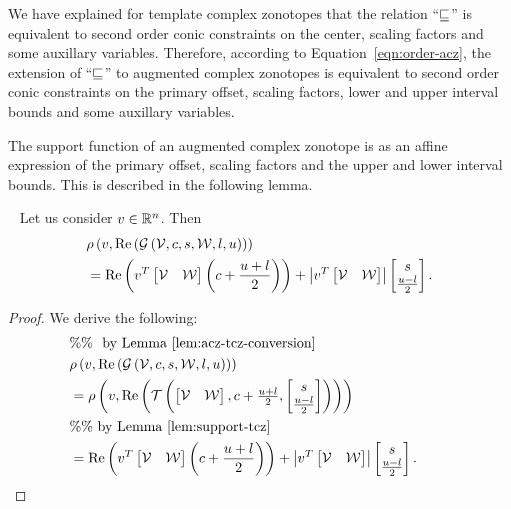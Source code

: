 %
\begin{remark}
We have explained for template complex zonotopes that the relation
``$\sqsubseteq$'' is equivalent to second order conic constraints on the
center, scaling factors and some auxillary variables.  Therefore,
according to Equation~\ref{eqn:order-acz}, the extension of ``$\sqsubseteq$''
to augmented complex zonotopes is equivalent to second order conic
constraints on the primary offset, scaling factors, lower and upper
interval bounds and some auxillary variables.
\end{remark}
%
The support function of an augmented complex zonotope is as an affine
expression of the primary offset, scaling factors and the upper and
lower interval bounds.  This is described in the following lemma.
%
\begin{lemma}~\label{lem:support-acz}
Let us consider
$v\in\mathbb{R}^n$.  Then
%
\begin{align*}
  & \rho\left(v,\operatorname{Re}\left(\mathcal{G}\left(\mathcal{V},c,s,\mathcal{W},l,u\right)\right)\right)\\
  & = \operatorname{Re}\left(v^T\left[\begin{matrix}\mathcal{V} &
    \mathcal{W}\end{matrix}\right]\left(c+\frac{u+l}{2}\right)\right)+\left|v^T\left[\begin{matrix}\mathcal{V} & \mathcal{W}\end{matrix}\right]\right|\left[\begin{matrix}s\\\frac{u-l}{2}\end{matrix}\right].
\end{align*}
%
\end{lemma}
%
\begin{proof}
  We derive the following:
  \begin{align*}
& \%\%~~\text{by Lemma~\ref{lem:acz-tcz-conversion}}\\
&
    \rho\left(v,\operatorname{Re}\left(\mathcal{G}\left(\mathcal{V},c,s,\mathcal{W},l,u\right)\right)\right)\\
& = \rho\left(v,\operatorname{Re}\left(\mathit{\operatorname{\mathcal{T}}}\left(\left[\begin{matrix}
      \mathcal{V} &
      \mathcal{W}
    \end{matrix}\right]
  ,\begin{matrix}
      c+\frac{u+l}{2}
    \end{matrix}
  ,\left[\begin{matrix}
      s\\
      \frac{u-l}{2}
    \end{matrix}\right]
  \right)
  \right)\right)\\
    & \%\%~\text{by Lemma~\ref{lem:support-tcz}}\\
    & =\operatorname{Re}\left(v^T\left[\begin{matrix}\mathcal{V} &
    \mathcal{W}\end{matrix}\right]\left(c+\frac{u+l}{2}\right)\right)+\left|v^T\left[\begin{matrix}\mathcal{V} & \mathcal{W}\end{matrix}\right]\right|\left[\begin{matrix}s\\\frac{u-l}{2}\end{matrix}\right].~\hspace{2em}\qedhere
  \end{align*}
\end{proof}
%


